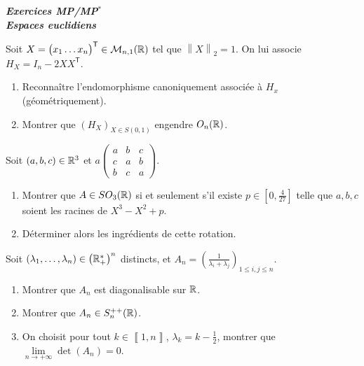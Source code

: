 \documentclass[12pt]{article}
\begin{document}
\begin{titlepage}
	\centering
	\vspace*{\fill}
	\Huge \textit{\textbf{Exercices MP/MP$^*$\\ Espaces euclidiens}}
	\vspace*{\fill}
\end{titlepage}
    
\begin{exercise}
	Soit $X=\begin{pmatrix}
		x_1\dots x_n
	\end{pmatrix}^{\mathsf{T}}\in\mathcal{M}_{n,1}(\mathbb{R})$ tel que $\left\lVert X\right\rVert_{2}=1$. On lui associe $H_X=I_n-2XX^{\mathsf{T}}$.
	\begin{enumerate}
		\item Reconnaître l'endomorphisme canoniquement associée à $H_x$ (géométriquement).
		\item Montrer que $(H_X)_{X\in S(0,1)}$ engendre $O_n(\mathbb{R})$.
	\end{enumerate}
\end{exercise}

\begin{exercise}
	Soit $(a,b,c)\in\mathbb{R}^{3}$ et $a\begin{pmatrix}
		a &b&c\\
		c&a&b\\
		b&c&a
	\end{pmatrix}$.
	\begin{enumerate}
		\item Montrer que $A\in SO_{3}(\mathbb{R})$ si et seulement s'il existe $p\in\left[0,\frac{4}{27}\right]$ telle que $a,b,c$ soient les racines de $X^{3}-X^{2}+p$.
		\item Déterminer alors les ingrédients de cette rotation.
	\end{enumerate}
\end{exercise}

\begin{exercise}
	Soit $(\lambda_{1},\dots,\lambda_{n})\in\left(\mathbb{R}_{+}^{*}\right)^{n}$ distincts, et $A_n=\left(\frac{1}{\lambda_{i}+\lambda_{j}}\right)_{1\leqslant i,j\leqslant n}$.
	\begin{enumerate}
		\item Montrer que $A_n$ est diagonalisable sur $\mathbb{R}$.
		\item Montrer que $A_n\in S_n^{++}(\mathbb{R})$.
		\item On choisit pour tout $k\in\left\llbracket 1,n\right\rrbracket$, $\lambda_{k}=k-\frac{1}{2}$, montrer que $\lim\limits_{n\to+\infty}\det(A_n)=0$.
	\end{enumerate} 
\end{exercise}
\end{document}
